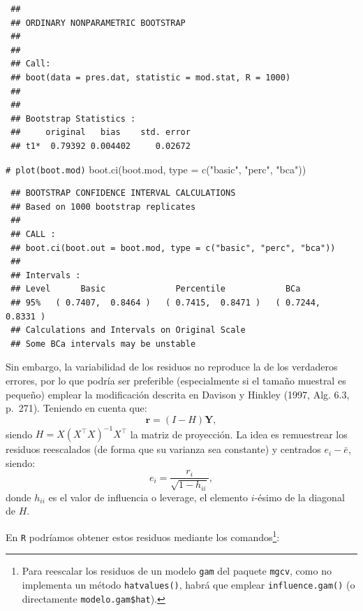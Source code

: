 \documentclass[
  10pt,
]{book}
\newenvironment{Shaded}{\begin{snugshade}}{\end{snugshade}}
\newcommand{\AttributeTok}[1]{\textcolor[rgb]{0.77,0.63,0.00}{#1}}
\newcommand{\CommentTok}[1]{\textcolor[rgb]{0.56,0.35,0.01}{\textit{#1}}}
\newcommand{\DecValTok}[1]{\textcolor[rgb]{0.00,0.00,0.81}{#1}}
\newcommand{\FunctionTok}[1]{\textcolor[rgb]{0.00,0.00,0.00}{#1}}
\newcommand{\NormalTok}[1]{#1}
\newcommand{\OtherTok}[1]{\textcolor[rgb]{0.56,0.35,0.01}{#1}}
\newcommand{\SpecialCharTok}[1]{\textcolor[rgb]{0.00,0.00,0.00}{#1}}
\newcommand{\StringTok}[1]{\textcolor[rgb]{0.31,0.60,0.02}{#1}}
\renewcommand{\mathbf}[1]{\symbf{#1}}
\theoremstyle{break}
\theoremstyle{nonumberplain}
\renewcommand{\CommentTok}[1]{\textcolor[rgb]{0.41,0.41,0.41}{\texttt{#1}}}
\let\oldfootnote\footnote
\renewcommand\footnote[1]{\oldfootnote{\hspace{2mm}#1}}
\begin{document}
\begin{verbatim}
 ## 
 ## ORDINARY NONPARAMETRIC BOOTSTRAP
 ## 
 ## 
 ## Call:
 ## boot(data = pres.dat, statistic = mod.stat, R = 1000)
 ## 
 ## 
 ## Bootstrap Statistics :
 ##     original   bias    std. error
 ## t1*  0.79392 0.004402     0.02672
\end{verbatim}

\begin{Shaded}
\begin{Highlighting}[]
\CommentTok{\# plot(boot.mod)}
\FunctionTok{boot.ci}\NormalTok{(boot.mod, }\AttributeTok{type =} \FunctionTok{c}\NormalTok{(}\StringTok{"basic"}\NormalTok{, }\StringTok{"perc"}\NormalTok{, }\StringTok{"bca"}\NormalTok{))}
\end{Highlighting}
\end{Shaded}

\begin{verbatim}
 ## BOOTSTRAP CONFIDENCE INTERVAL CALCULATIONS
 ## Based on 1000 bootstrap replicates
 ## 
 ## CALL : 
 ## boot.ci(boot.out = boot.mod, type = c("basic", "perc", "bca"))
 ## 
 ## Intervals : 
 ## Level      Basic              Percentile            BCa          
 ## 95%   ( 0.7407,  0.8464 )   ( 0.7415,  0.8471 )   ( 0.7244,  0.8331 )  
 ## Calculations and Intervals on Original Scale
 ## Some BCa intervals may be unstable
\end{verbatim}

Sin embargo, la variabilidad de los residuos no reproduce la de los verdaderos errores, por lo que podría ser preferible (especialmente si el tamaño muestral es pequeño) emplear la modificación descrita en Davison y Hinkley (1997, Alg. 6.3, p.~271).
Teniendo en cuenta que:
\[\mathbf{r} = \left( I - H \right)\mathbf{Y},\]
siendo \(H = X\left( X^{\top}X\right)^{-1}X^{\top}\) la matriz de proyección.
La idea es remuestrear los residuos reescalados (de forma que su varianza sea constante) y centrados \(e_i - \bar{e}\), siendo:
\[e_i = \frac{r_i}{\sqrt{1 - h_{ii}}},\]
donde \(h_{ii}\) es el valor de influencia o leverage, el elemento \(i\)-ésimo de la diagonal de \(H\).

En \texttt{R} podríamos obtener estos residuos mediante los comandos\footnote{Para reescalar los
  residuos de un modelo \texttt{gam} del paquete \texttt{mgcv}, como no implementa un método \texttt{hatvalues()},
  habrá que emplear \texttt{influence.gam()} (o directamente \texttt{modelo.gam\$hat}).}:

\begin{Shaded}
\end{Shaded}
\end{document}
